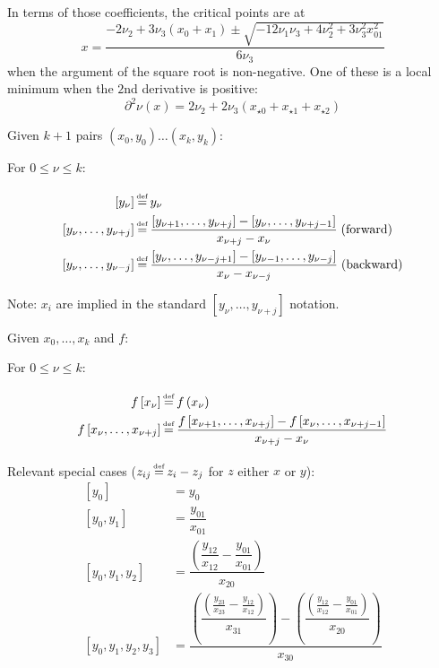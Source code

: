 In terms of those coefficients, the critical points are at
\begin{equation}
x=\frac{-2 \nu_2 + 3 \nu_3 \left( x_0 + x_1 \right) 
\pm \sqrt{-12 \nu_1 \nu_3 + 4 \nu_2^{2} + 3 \nu_3^{2} x_{01}^{2}}
}
{ 6 \nu_3}
\end{equation}
when the argument of the square root is non-negative.
One of these is a local minimum when the $2$nd derivative is positive:
\begin{equation}
\partial^2 \nu(x) = 2\nu_2
 + 2 \nu_3 \left(x_{{\star}0} + x_{{\star}1} + x_{{\star}2}\right)
\end{equation}

\newpage
\setcounter{currentlevel}{\value{baseSectionLevel}}
\label{sec:Divided-differences}
\cite{wiki:Divided-differences}
Given $k+1$ pairs 
$\left( x_0, y_0 \right) \ldots \left( x_k, y_k \right) $:

For $0 \leq \nu \leq k$:

\begin{align}
\left[ y_{\nu} \right] & \operatorname*{\overset{\underset{\mathrm{def}}{}}{=}} y_{\nu}
\\
\left[ y_{\nu}, \ldots , y_{\nu + j} \right] & \operatorname*{\overset{\underset{\mathrm{def}}{}}{=}} 
\frac{
\left[ y_{\nu + 1}, \ldots ,  y_{\nu + j} \right]
-
\left[ y_{\nu}, \ldots ,  y_{\nu + j - 1} \right]
}{
x_{\nu + j} - x_{\nu}
} 
\; \text{(forward)}
\nonumber
\\
\left[ y_{\nu}, \ldots , y_{\nu - j} \right] & \operatorname*{\overset{\underset{\mathrm{def}}{}}{=}} 
\frac{
\left[ y_{\nu}, \ldots ,  y_{\nu - j + 1} \right]
-
\left[ y_{\nu - 1}, \ldots ,  y_{\nu - j} \right]
}{
x_{\nu} - x_{\nu - j}
} 
\; \text{(backward)}
\nonumber
\end{align}

Note: $x_i$ are implied in the standard 
$\left[ y_{\nu}, \ldots , y_{\nu + j} \right]$ notation.

Given $x_0, \ldots , x_k$ and $f$:

For $0 \leq \nu \leq k$:

\begin{align}
f \left[ x_{\nu} \right] & \operatorname*{\overset{\underset{\mathrm{def}}{}}{=}} f \left( x_{\nu} \right)
\\
f \left[ x_{\nu}, \ldots , x_{\nu + j} \right] & \operatorname*{\overset{\underset{\mathrm{def}}{}}{=}} 
\frac{
f \left[ x_{\nu + 1}, \ldots ,  x_{\nu + j} \right]
-
f \left[ x_{\nu}, \ldots ,  x_{\nu + j - 1} \right]
}{
x_{\nu + j} - x_{\nu}
} 
\nonumber
\end{align}

Relevant special cases ($z_{ij} \operatorname*{\overset{\underset{\mathrm{def}}{}}{=}} z_i - z_j$ for $z$ 
either $x$ or $y$): 
\begin{align}
\left[ y_0 \right] & = y_0 
\\
\left[ y_0 , y_1  \right] & = 
\dfrac{y_{01}}{x_{01}} 
\nonumber
\\
\left[ y_0 , y_1 , y_2 \right] & = 
\dfrac{
\left( \dfrac{y_{12}}{x_{12}} - \dfrac{y_{01}}{x_{01}} \right)
}{
x_{20}
} 
\nonumber
\\
\left[ y_0 , y_1 , y_2 , y_3 \right] & = 
\dfrac{
 \left(
 \dfrac{
 \left(
  \frac{y_{23}}{x_{23}} - \frac{y_{12}}{x_{12}}
  \right)
  }{x_{31}}
  \right)
 -
 \left(
 \dfrac{
 \left(
  \frac{y_{12}}{x_{12}} - \frac{y_{01}}{x_{01}}
  \right)
  }{x_{20}}
  \right)
}{
x_{30}
} 
\nonumber
\end{align}

